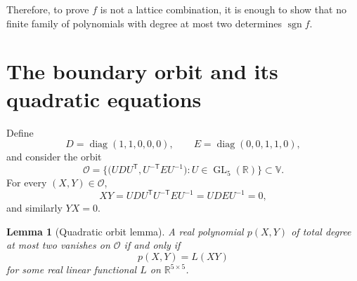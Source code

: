 \documentclass[11pt]{amsart}
\newtheorem{lemma}[theorem]{Lemma}
\theoremstyle{remark}
\DeclareMathOperator{\GL}{GL}
\DeclareMathOperator{\diag}{diag}
\DeclareMathOperator{\sgn}{sgn}
\newcommand{\tp}{{\scriptscriptstyle\mathsf{T}}}
\begin{document}
Therefore, to prove $f$ is not a lattice combination, it is enough to show that no finite family of polynomials with degree at most two determines $\sgn f$.

\section{The boundary orbit and its quadratic equations}

Define
\[
D=\diag(1,1,0,0,0),
\qquad
E=\diag(0,0,1,1,0),
\]
and consider the orbit
\begin{equation}
\mathcal O=
\bigl\{
\bigl(UDU^\tp ,U^{-\tp} EU^{-1}\bigr):U\in\GL_5(\mathbb R)
\bigr\}\subset \mathbb{V}.
\label{eq:orbit}
\end{equation}
For every $(X,Y)\in\mathcal O$,
\[
XY=UDU^\tp U^{-\tp} EU^{-1}=UDEU^{-1}=0,
\]
and similarly $YX=0$.

\begin{lemma}[Quadratic orbit lemma]\label{lem:quadratic-orbit}
A real polynomial $p(X,Y)$ of total degree at most two vanishes on $\mathcal O$ if and only if
\[
p(X,Y)=L(XY)
\]
for some real linear functional $L$ on $\mathbb{R}^{5 \times 5}$.
\end{lemma}
\end{document}
